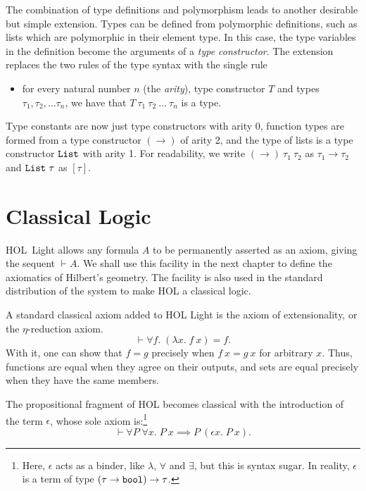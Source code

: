 The combination of type definitions and polymorphism leads to another desirable but simple extension. Types can be defined from polymorphic definitions, such as lists which are polymorphic in their element type. In this case, the type variables in the definition become the arguments of a \emph{type constructor}. The extension replaces the two rules of the type syntax with the single rule

\begin{itemize}
\item[] for every natural number $n$ (the \emph{arity}), type constructor $T$ and types $\tau_1, \tau_2, \ldots \tau_n$, we have that $T\ \tau_1\ \tau_2\ \ldots\ \tau_n$ is a type.
\end{itemize}

Type constants are now just type constructors with arity 0, function types are formed from a type constructor $(\rightarrow)$ of arity 2, and the type of lists is a type constructor $\texttt{List}$ with arity 1. For readability, we write $(\rightarrow)\ \tau_1\ \tau_2$ as $\tau_1 \rightarrow \tau_2$ and $\texttt{List}\ \tau$ as $[\tau]$.

\section{Classical Logic}\label{sec:ClassicalAxioms}
HOL~Light allows any formula $A$ to be permanently asserted as an axiom, giving the sequent $\vdash A$. We shall use this facility in the next chapter to define the axiomatics of Hilbert's geometry. The facility is also used in the standard distribution of the system to make HOL a classical logic.

A standard classical axiom added to HOL Light is the axiom of extensionality, or the $\eta$-reduction axiom. 
\begin{displaymath}
\vdash \forall f.\; (\lambda x.\; f\ x) = f.
\end{displaymath}
With it, one can show that $f = g$ precisely when $f\ x = g\ x$ for arbitrary $x$. Thus, functions are equal when they agree on their outputs, and sets are equal precisely when they have the same members.

The propositional fragment of HOL becomes classical with the introduction of the term $\epsilon$, whose sole axiom is:\footnote{Here, $\epsilon$ acts as a binder, like $\lambda$, $\forall$ and $\exists$, but this is syntax sugar. In reality, $\epsilon$ is a term of type $(\tau \rightarrow \texttt{bool}) \rightarrow \tau$.}
\begin{displaymath}
\vdash \forall P\;\forall x.\; P\ x \implies P\ (\epsilon x.\; P\ x).
\end{displaymath}

